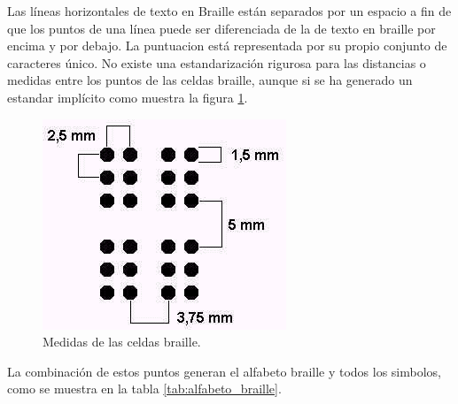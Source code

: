 Las l\'ineas horizontales de texto en Braille est\'an separados por un espacio
a fin de que los puntos de una l\'inea puede ser diferenciada de la de texto
en braille por encima y por debajo. La puntuacion est\'a representada por su
propio conjunto de caracteres \'unico. No existe una estandarizaci\'on
rigurosa para las distancias o medidas entre los puntos de las celdas braille,
aunque si se ha generado un estandar impl\'icito como muestra la figura
\ref{fig:distance_dots_braille}.

\begin{figure}
\centering
\includegraphics[scale=1]{./img/distance_dots_braille.png}
\caption{Medidas de las celdas braille.}
\label{fig:distance_dots_braille}
\end{figure}

La combinaci\'on de estos puntos generan el alfabeto braille y todos los
simbolos, como se muestra en la tabla \ref{tab:alfabeto_braille}.

